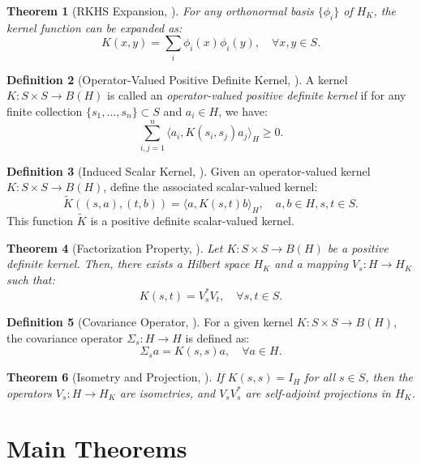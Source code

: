 \documentclass[11pt]{amsart}
\newtheorem{theorem}{Theorem}[section]
\theoremstyle{definition}
\newtheorem{definition}[theorem]{Definition}
\numberwithin{equation}{section}
\begin{document}
\begin{theorem}[RKHS Expansion, \cite{Jorgensen2024}]
For any orthonormal basis $\{\phi_i\}$ of $H_K$, the kernel function can be expanded as:
\[
    K(x, y) = \sum_{i} \phi_i(x) \phi_i(y), \quad \forall x, y \in S.
\]
\end{theorem}

\begin{definition}[Operator-Valued Positive Definite Kernel, \cite{Jorgensen2024}]
A kernel $K: S \times S \to B(H)$ is called an \emph{operator-valued positive definite kernel} if for any finite collection $\{s_1, \dots, s_n\} \subset S$ and $a_i \in H$, we have:
\[
    \sum_{i,j=1}^{n} \langle a_i, K(s_i, s_j) a_j \rangle_H \geq 0.
\]
\end{definition}

\begin{definition}[Induced Scalar Kernel, \cite{Gelfand2004}]
Given an operator-valued kernel $K: S \times S \to B(H)$, define the associated scalar-valued kernel:
\[
    \tilde{K}((s, a), (t, b)) = \langle a, K(s, t) b \rangle_H, \quad a, b \in H, s, t \in S.
\]
This function $\tilde{K}$ is a positive definite scalar-valued kernel.
\end{definition}

\begin{theorem}[Factorization Property, \cite{Hashemi2018}]
Let $K: S \times S \to B(H)$ be a positive definite kernel. Then, there exists a Hilbert space $H_K$ and a mapping $V_s: H \to H_K$ such that:
\[
    K(s, t) = V_s^* V_t, \quad \forall s, t \in S.
\]
\end{theorem}

\begin{definition}[Covariance Operator, \cite{Rasmussen2006}]
For a given kernel $K: S \times S \to B(H)$, the covariance operator $\Sigma_s: H \to H$ is defined as:
\[
    \Sigma_s a = K(s, s) a, \quad \forall a \in H.
\]
\end{definition}

\begin{theorem}[Isometry and Projection, \cite{Jorgensen2024}]
If $K(s, s) = I_H$ for all $s \in S$, then the operators $V_s: H \to H_K$ are isometries, and $V_s V_s^*$ are self-adjoint projections in $H_K$.
\end{theorem}

\section{Main Theorems}
\end{document}
